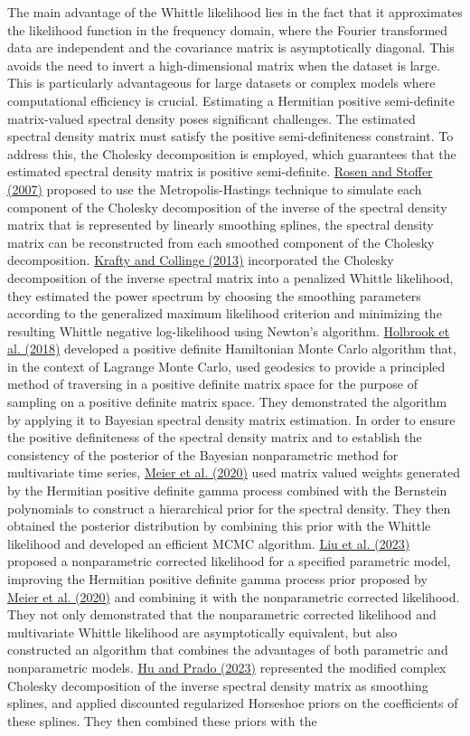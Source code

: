 \documentclass[12pt,a4paper]{article}
\begin{document}
The main advantage of the Whittle likelihood lies in the fact that it approximates the likelihood function in the frequency domain, where the Fourier transformed data are independent and the covariance matrix is asymptotically diagonal. This avoids the need to invert a high-dimensional matrix when the dataset is large. This is particularly advantageous for large datasets or complex models where computational efficiency is crucial. Estimating a Hermitian positive semi-definite matrix-valued spectral density poses significant challenges. The estimated spectral density matrix must satisfy the positive semi-definiteness constraint. To address this, the Cholesky decomposition is employed, which guarantees that the estimated spectral density matrix is positive semi-definite. \hyperref[rosen-stoffer-2007]{Rosen and Stoffer (2007)} proposed to use the Metropolis-Hastings technique to simulate each component of the Cholesky decomposition of the inverse of the spectral density matrix that is represented by linearly smoothing splines, the spectral density matrix can be reconstructed from each smoothed component of the Cholesky decomposition. \hyperref[Krafty 2013]{Krafty and Collinge (2013)} incorporated the Cholesky decomposition of the inverse spectral matrix into a penalized Whittle likelihood, they estimated the power spectrum by choosing the smoothing parameters according to the generalized maximum likelihood criterion and minimizing the resulting Whittle negative log-likelihood using Newton's algorithm. \hyperref[Holbrook 2018]{Holbrook et al. (2018)} developed a positive definite Hamiltonian Monte Carlo algorithm that, in the context of Lagrange Monte Carlo, used geodesics to provide a principled method of traversing in a positive definite matrix space for the purpose of sampling on a positive definite matrix space. They demonstrated the algorithm by applying it to Bayesian spectral density matrix estimation. In order to ensure the positive definiteness of the spectral density matrix and to establish the consistency of the posterior of the Bayesian nonparametric method for multivariate time series, \hyperref[Meier 2018]{Meier et al. (2020)} used matrix valued weights generated by the Hermitian positive definite gamma process combined with the Bernstein polynomials to construct a hierarchical  prior for the spectral density. They then obtained the posterior distribution by combining this prior with the Whittle likelihood and developed an efficient MCMC algorithm. \hyperref[liu 2023]{Liu et al. (2023)} proposed a nonparametric corrected likelihood for a specified parametric model, improving the Hermitian positive definite gamma process prior proposed by \hyperref[Meier 2018]{Meier et al. (2020)} and combining it with the nonparametric corrected likelihood. They not only demonstrated that the nonparametric corrected likelihood and multivariate Whittle likelihood are asymptotically equivalent, but also constructed an algorithm that combines the advantages of both parametric and nonparametric models. \hyperref[hu2023]{Hu and Prado (2023)} represented the modified complex Cholesky decomposition of the inverse spectral density matrix as smoothing splines, and applied discounted regularized Horseshoe priors on the coefficients of these splines. They then combined these priors with the 
\end{document}
